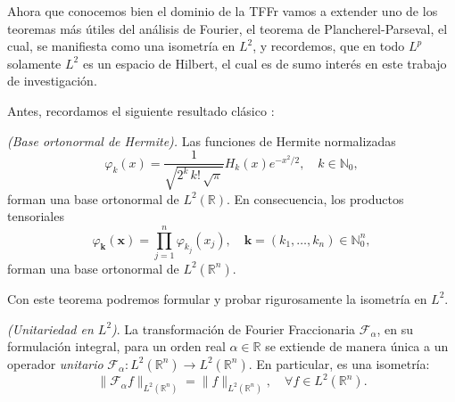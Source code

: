             Ahora que conocemos bien el dominio de la TFFr vamos a extender uno de los teoremas más útiles del análisis de Fourier, el teorema de Plancherel-Parseval, el cual, se manifiesta como una isometría en $L^2$, y recordemos, que en todo $L^p$ solamente $L^2$ es un espacio de Hilbert, el cual es de sumo interés en este trabajo de investigación.

            Antes, recordamos el siguiente resultado clásico \citep[Thm. 5.7.1]{szego1975orthogonal}:

            \begin{theorem*}\textit{(Base ortonormal de Hermite).} Las funciones de Hermite normalizadas
            \begin{equation*}
                \varphi_k(x) = \frac{1}{\sqrt{2^k \, k! \, \sqrt{\pi}}}H_k(x)e^{-x^2/2}, \quad k \in \mathbb{N}_0,
            \end{equation*}
            forman una base ortonormal de $L^2(\mathbb{R})$. En consecuencia, los productos tensoriales 
            \begin{equation*}
                \varphi_{\boldsymbol{k}}(\mathbf{x}) = \prod_{j=1}^n \varphi_{k_j}(x_j), \quad \boldsymbol{k} = (k_1,\dots,k_n) \in \mathbb{N}_0^n,
            \end{equation*}
            forman una base ortonormal de $L^2(\mathbb{R}^n)$.
            \end{theorem*}
            
            Con este teorema podremos formular y probar rigurosamente la isometría en $L^2$.

            \begin{proposition}\label{prop:isometriaL2}
		        \textit{(Unitariedad en $L^2$)}. La transformación de Fourier Fraccionaria $\mathcal{F}_\alpha$, en su formulación integral, para un orden real $\alpha \in \mathbb{R}$ se extiende de manera única a un operador \emph{unitario} $\mathcal{F}_\alpha : L^2(\mathbb{R}^n)\to L^2(\mathbb{R}^n)$. En particular, es una isometría:
                \begin{equation}
                    \|\mathcal{F}_\alpha f\|_{L^2(\mathbb{R}^n)} = \|f\|_{L^2(\mathbb{R}^n)},\quad \forall f \in L^2(\mathbb{R}^n).
                \end{equation}
	        \end{proposition}
	
